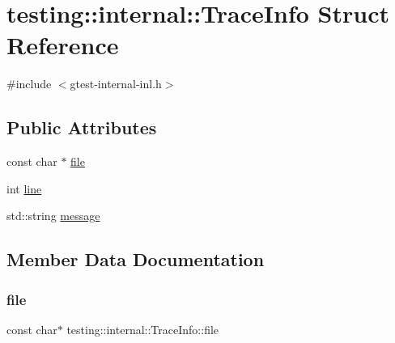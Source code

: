 \hypertarget{structtesting_1_1internal_1_1_trace_info}{}\section{testing\+:\+:internal\+:\+:Trace\+Info Struct Reference}
\label{structtesting_1_1internal_1_1_trace_info}


{\ttfamily \#include $<$gtest-\/internal-\/inl.\+h$>$}

\subsection*{Public Attributes}
\begin{DoxyCompactItemize}
\item 
const char $\ast$ \hyperlink{structtesting_1_1internal_1_1_trace_info_a5d801209d3c0840aa55cfd4b67504254}{file}
\item 
int \hyperlink{structtesting_1_1internal_1_1_trace_info_ae9d269de1b77f4a3180d0d34acb4d7ff}{line}
\item 
std\+::string \hyperlink{structtesting_1_1internal_1_1_trace_info_a39e74f39ce6d5fdbac799abdb1c27f90}{message}
\end{DoxyCompactItemize}


\subsection{Member Data Documentation}
\mbox{\label{structtesting_1_1internal_1_1_trace_info_a5d801209d3c0840aa55cfd4b67504254}} 
\subsubsection{\texorpdfstring{file}{file}}
{\footnotesize\ttfamily const char$\ast$ testing\+::internal\+::\+Trace\+Info\+::file}

\mbox{\label{structtesting_1_1internal_1_1_trace_info_ae9d269de1b77f4a3180d0d34acb4d7ff}} 
